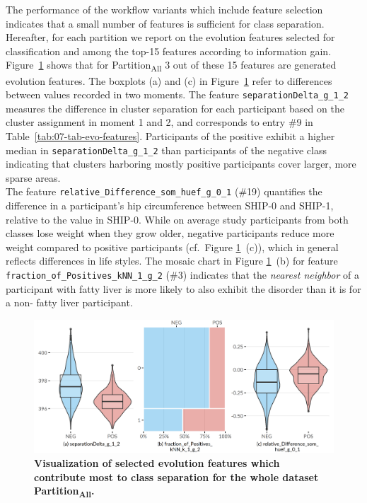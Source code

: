 \documentclass[
  oneside]{book}
\begin{document}
The performance of the workflow variants which include feature selection indicates that a small number of features is sufficient for class separation.
Hereafter, for each partition we report on the evolution features selected for classification and among the top-15 features according to information gain.
Figure~\ref{fig:07-imp-features-all} shows that for Partition\textsubscript{All} 3 out of these 15 features are generated evolution features.
The boxplots (a) and (c) in Figure~\ref{fig:07-imp-features-all} refer to differences between values recorded in two moments.
The feature \texttt{separationDelta\_g\_1\_2} measures the difference in cluster separation for each participant based on the cluster assignment in moment 1 and 2, and corresponds to entry \#9 in Table~\ref{tab:07-tab-evo-features}.
Participants of the positive exhibit a higher median in \texttt{separationDelta\_g\_1\_2} than participants of the negative class indicating that clusters harboring mostly positive participants cover larger, more sparse areas.\\
The feature \texttt{relative\_Difference\_som\_huef\_g\_0\_1} (\#19) quantifies the difference in a participant's hip circumference between SHIP-0 and SHIP-1, relative to the value in SHIP-0.
While on average study participants from both classes lose weight when they grow older, negative participants reduce more weight compared to positive participants (cf.~Figure \ref{fig:07-imp-features-all}~(c)), which in general reflects differences in life styles.
The mosaic chart in Figure \ref{fig:07-imp-features-all}~(b) for feature \texttt{fraction\_of\_Positives\_kNN\_1\_g\_2} (\#3) indicates that the \emph{nearest neighbor} of a participant with fatty liver is more likely to also exhibit the disorder than it is for a non- fatty liver participant.



\begin{figure}[htbp]

{\centering \includegraphics[width=0.75\linewidth]{figures/07-imp-features-all} 

}

\caption{\textbf{Visualization of selected evolution features which contribute most to class separation for the whole dataset Partition\textsubscript{All}.}}\label{fig:07-imp-features-all}
\end{figure}
\end{document}
